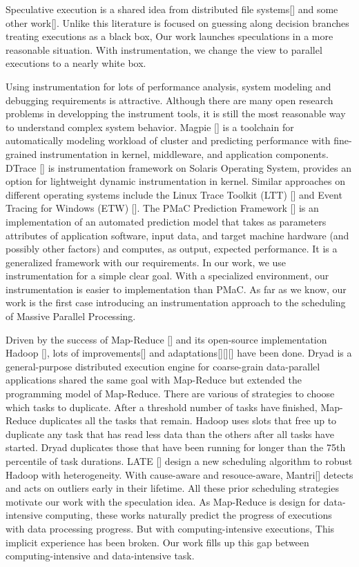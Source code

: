 Speculative execution is a shared idea from distributed file systems[] and some other work[]. Unlike this literature is focused on guessing along decision branches treating executions as a black box, Our work launches speculations in a more reasonable situation. With instrumentation, we change the view to parallel executions to a nearly white box.

Using instrumentation for lots of performance analysis, system modeling and debugging requirements is attractive. Although there are many open research problems in developping the instrument tools, it is still the most reasonable way to understand complex system behavior. Magpie [] is a toolchain for automatically modeling workload of cluster and predicting performance with fine-grained instrumentation in kernel, middleware, and application components. DTrace [] is instrumentation framework on Solaris Operating System, provides an option for lightweight dynamic instrumentation in kernel. Similar approaches on different operating systems include the Linux Trace Toolkit (LTT) [] and Event Tracing for Windows (ETW) []. The PMaC Prediction Framework [] is an implementation of an automated prediction model that takes as parameters attributes of application software, input data, and target machine hardware (and possibly other factors) and computes, as output, expected performance. It is a generalized framework with our requirements. In our work, we use instrumentation for a simple clear goal. With a specialized environment, our instrumentation is easier to implementation than PMaC. As far as we know, our work is the first case introducing an instrumentation approach to the scheduling of Massive Parallel Processing.

Driven by the success of Map-Reduce [] and its open-source implementation Hadoop [], lots of improvements[] and adaptations[][][] have been done. Dryad is a general-purpose distributed execution engine for coarse-grain data-parallel applications shared the same goal with Map-Reduce but extended the programming model of Map-Reduce. There are various of strategies to choose which tasks to duplicate. After a threshold number of tasks havefinished, Map-Reduce duplicates all the tasks that remain. Hadoop uses slots that free up to duplicate any task that has read less data than the others after all tasks have started. Dryad duplicates those that have been running for longer than the 75th percentile of task durations. LATE [] design a new scheduling algorithm to robust Hadoop with heterogeneity. With cause-aware and resouce-aware, Mantri[] detects and acts on outliers early in their lifetime. All these prior scheduling strategies motivate our work with the speculation idea. As Map-Reduce is design for data-intensive computing, these works naturally predict the progress of executions with data processing progress. But with computing-intensive executions, This implicit experience has been broken. Our work fills up this gap between computing-intensive and data-intensive task.


